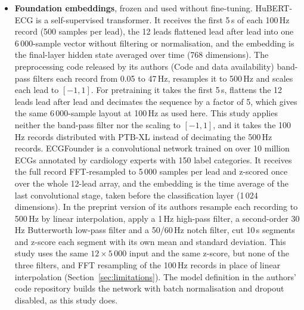 \documentclass[preprint,11pt]{elsarticle}
\begin{document}
\begin{itemize}
fraction of beats with a detected P wave, the mean and standard deviation of the P-wave
amplitude, the mean width of the QRS complex, the mean and standard deviation of the
R-peak amplitude, and the mean and standard deviation of the correlation of each beat
($\pm 250$\,ms) with the median beat of the record. All are continuous except the beat
count. A feature that cannot be computed for a record (for example, when no P wave is
detected) is replaced by the median of that feature over the cohort.
\item \textbf{Foundation embeddings}, frozen and used without fine-tuning. HuBERT-ECG
\cite{hubertecg2024} is a self-supervised transformer. It receives the first 5\,s of each
100\,Hz record (500 samples per lead), the 12 leads flattened lead after lead into one
6\,000-sample vector without filtering or normalisation, and the embedding is the
final-layer hidden state averaged over time (768 dimensions). The preprocessing code
released by its authors (Code and data availability) band-pass filters each record from
0.05 to 47\,Hz, resamples it to 500\,Hz and scales each lead to $[-1,1]$. For pretraining
it takes the first 5\,s, flattens the 12 leads lead after lead and decimates the sequence
by a factor of 5, which gives the same 6\,000-sample layout at 100\,Hz as used here. This
study applies neither the band-pass filter nor the scaling to $[-1,1]$, and it takes the
100\,Hz records distributed with PTB-XL instead of decimating the 500\,Hz records.
ECGFounder \cite{ecgfounder2024} is a convolutional network trained on over 10 million
ECGs annotated by cardiology experts with 150 label categories. It receives the full
record FFT-resampled to 5\,000 samples per lead and z-scored once over the whole 12-lead
array, and the embedding is the time average of the last convolutional stage, taken before
the classification layer (1\,024 dimensions). In the preprint version of
\cite{ecgfounder2024} its authors resample each recording to 500\,Hz by linear
interpolation, apply a 1\,Hz high-pass filter, a second-order 30\,Hz Butterworth low-pass
filter and a 50/60\,Hz notch filter, cut 10\,s segments and z-score each segment with its
own mean and standard deviation. This study uses the same $12 \times 5\,000$ input and the
same z-score, but none of the three filters, and FFT resampling of the 100\,Hz records in
place of linear interpolation (Section~\ref{sec:limitations}). The model definition in the
authors' code repository builds the network with batch normalisation and dropout disabled,
as this study does.
\end{itemize}
\end{document}
